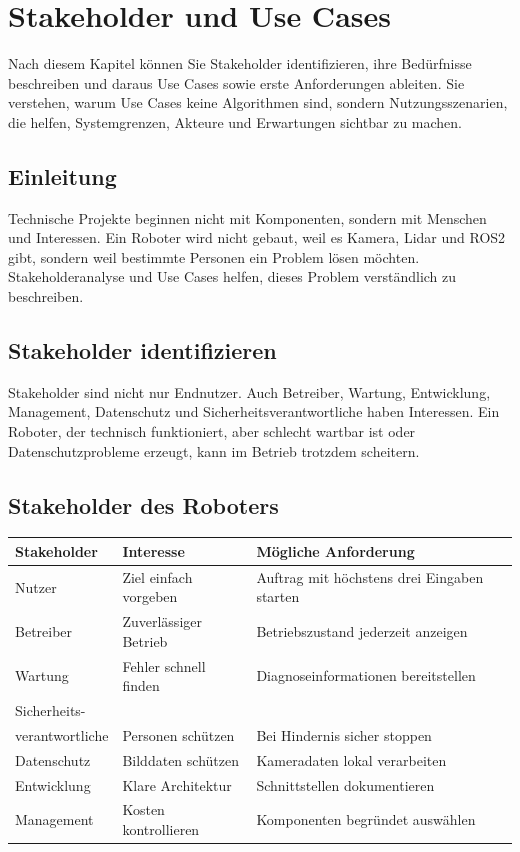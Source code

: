 \chapter{Stakeholder und Use Cases}

\begin{lernziele}
Nach diesem Kapitel können Sie Stakeholder identifizieren, ihre Bedürfnisse beschreiben und daraus Use Cases sowie erste Anforderungen ableiten. Sie verstehen, warum Use Cases keine Algorithmen sind, sondern Nutzungsszenarien, die helfen, Systemgrenzen, Akteure und Erwartungen sichtbar zu machen.
\end{lernziele}

\section{Einleitung}
Technische Projekte beginnen nicht mit Komponenten, sondern mit Menschen und Interessen. Ein Roboter wird nicht gebaut, weil es Kamera, Lidar und ROS2 gibt, sondern weil bestimmte Personen ein Problem lösen möchten. Stakeholderanalyse und Use Cases helfen, dieses Problem verständlich zu beschreiben.

\section{Stakeholder identifizieren}
Stakeholder sind nicht nur Endnutzer. Auch Betreiber, Wartung, Entwicklung, Management, Datenschutz und Sicherheitsverantwortliche haben Interessen. Ein Roboter, der technisch funktioniert, aber schlecht wartbar ist oder Datenschutzprobleme erzeugt, kann im Betrieb trotzdem scheitern.

\section{Stakeholder des Roboters}
\begin{longtable}{p{}p{}p{}}
\toprule
Stakeholder & Interesse & Mögliche Anforderung\\
\midrule
Nutzer & Ziel einfach vorgeben & Auftrag mit höchstens drei Eingaben starten\\
Betreiber & Zuverlässiger Betrieb & Betriebszustand jederzeit anzeigen\\
Wartung & Fehler schnell finden & Diagnoseinformationen bereitstellen\\
Sicherheits-\\verantwortliche & Personen schützen & Bei Hindernis sicher stoppen\\
Datenschutz & Bilddaten schützen & Kameradaten lokal verarbeiten\\
Entwicklung & Klare Architektur & Schnittstellen dokumentieren\\
Management & Kosten kontrollieren & Komponenten begründet auswählen\\
\bottomrule
\end{longtable}

